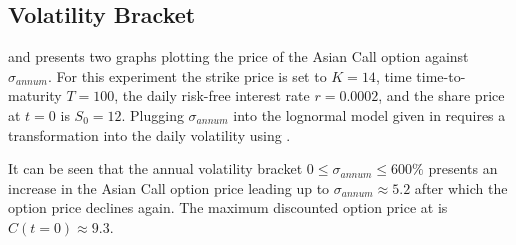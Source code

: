 \documentclass[12pt,a4paper]{article}
\begin{document}
\subsection{Volatility Bracket}
\label{sec:volatility-bracket}

 and 
presents two graphs plotting the price of the Asian Call option
against $\sigma_{annum}$. For this experiment the strike price is set
to $K=14$, time time-to-maturity $T=100$, the daily risk-free interest
rate $r=0.0002$, and the share price at $t=0$ is $S_{0}=12$. Plugging
$\sigma_{annum}$ into the lognormal model given in
 requires a transformation into the
daily volatility using .

It can be seen that the annual volatility bracket $0\leq
\sigma_{annum} \leq 600 \%$ presents an increase in the Asian Call
option price leading up to $\sigma_{annum} \approx 5.2$ after which the
option price declines again. The maximum discounted option price at is
$C(t=0)\approx 9.3$.
\end{document}
